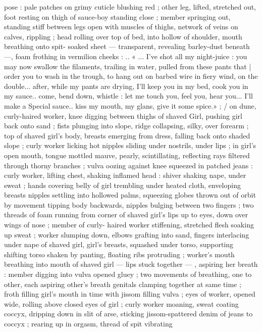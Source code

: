 pose : pale patches on grimy cuticle blushing red ; other leg, lifted,
stretched out, foot resting on thigh of sauce-boy standing close ;
member springing out, standing stiff between legs open with
muscles of thighs, network of veins on calves, rippling ; head rolling
over top of bed, into hollow of shoulder, mouth breathing onto spit-
soaked sheet --- transparent, revealing barley-dust beneath ---,
foam frothing in vermilion cheeks : .. « ... I've shot all my night-juice
: you may now swallow the filaments, trailing in water, pulled from
these pants that | order you to wash in the trough, to hang out on
barbed wire in fiery wind, on the double... after, while my pants are
drying, I'll keep you in my bed, cook you in my sauce.. come, bend
down, whistle : let me touch you, feel you, hear you... I'll make a
Special sauce.. kiss my mouth, my glans, give it some spice.» ; / on
dune, curly-haired worker, knee digging between thighs of shaved
Girl, pushing girl back onto sand ; fists plunging into slope, ridge
collapsing, silky, over forearm ; top of shaved girl's body, breasts
emerging from dress, falling back onto shaded slope ; curly worker
licking hot nipples sliding under nostrils, under lips ; in girl's open
mouth, tongue mottled mauve, pearly, scintillating, reflecting rays
filtered through thorny branches ; vulva oozing against knee
squeezed in patched jeans : curly worker, lifting chest, shaking
inflamed head : shiver shaking nape, under sweat ; hands covering
belly of girl trembling under heated cloth, enveloping breasts
nipples settling into hollowed palms, squeezing globes thrown out of
orbit by movement tipping body backwards, nipples bulging between
two fingers ; two threads of foam running from corner of shaved
girl's lips up to eyes, down over wings of nose ; member of curly-
haired worker stiffening, stretched flesh soaking up sweat ; worker
slumping down, elbows grafting into sand, fingers interlacing under
nape of shaved girl, girl's breasts, squashed under torso, supporting
shifting torso shaken by panting, floating ribs protruding ; worker's
mouth breathing into mouth of shaved girl --- lips stuck together ---
, aspiring her breath : member digging into vulva opened gluey ; two
movements of breathing, one to other, each aspiring other's breath
genitals clamping together at same time ; froth filling girl's mouth in
time with jissom filling vulva ; eyes of worker, opened wide, rolling
above closed eyes of girl ; curly worker moaning, sweat coating
coccyx, dripping down in slit of arse, sticking jissom-spattered denim
of jeans to coccyx ; rearing up in orgasm, thread of spit vibrating
